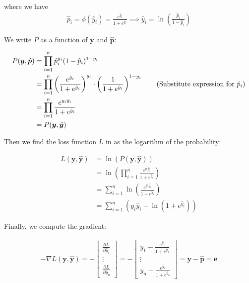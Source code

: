 \documentclass[12pt]{article}
\begin{document}
\begin{enumerate}
where we have
\begin{align*}
	\hat{p}_i = \phi(\hat{y}_i) = \frac{e^{\hat{y}_i}}{1 + e^{\hat{y}_i}}
	\implies 
	\hat{y}_i = \ln  \left(\frac{\hat{p}_i}{1 - \hat{p}_i}\right)
\end{align*}

We write $P$ as a function of $\bm{y}$ and $\hat{\bm{p}}$:

\begin{align*}
	P(\bm{y}, \hat{\bm{p}})
	&= \prod_{i=1}^{n}\hat{p}_i^{y_i}(1-\hat{p}_i)^{1-y_i}\\
	&= \prod_{i=1}^{n}
	\left(\frac{e^{\hat{y}_i}}{1 + e^{\hat{y}_i}}\right)^{y_i}\cdot
	\left(\frac{1}{1 + e^{\hat{y}_i}}\right)^{1 - y_i}
	\tag{Substitute expression for $\hat{p}_i$}\\
	&= \prod_{i=1}^{n} \frac{e^{y_i \hat{y}_i}}{1 + e^{\hat{y}_i}}\\
	&=P(\bm{y}, \hat{\bm{y}})
\end{align*}

Then we find the loss function $L$ in as the logarithm of the probability:

\begin{align*}
	L(\bm{y}, \hat{\bm{y}})
	&=\ln(P(\bm{y}, \hat{\bm{y}}))\\
	&=\ln \left(\prod_{i=1}^{n} \frac{e^{y_i \hat{y}_i}}{1 + e^{\hat{y}_i}}\right)\\
	&=\sum_{i=1}^{n}\ln\left(\frac{e^{y_i \hat{y}_i}}{1 + e^{\hat{y}_i}}\right)
	\tag{Product property of logarithms}\\
	&=\sum_{i=1}^{n}(y_i\hat{y}_i - \ln(1 + e^{\hat{y}_i}))
	\tag{Quotient property of logarithms}
\end{align*}

Finally, we compute the gradient:

\begin{align*}
	-\nabla L(\bm{y}, \hat{\bm{y}})
	= -\begin{bmatrix}
		\frac{\partial L}{\partial \hat{y}_1}\\
		\vdots\\
		\frac{\partial L}{\partial \hat{y}_n}
	\end{bmatrix}
	= -\begin{bmatrix}
		y_1 - \frac{e^{\hat{y}_1}}{1 + e^{\hat{y}_1}}\\
		\vdots\\
		y_n - \frac{e^{\hat{y}_n}}{1 + e^{\hat{y}_n}}
	\end{bmatrix}
	=\bm{y} - \hat{\bm{p}}
	=\bm{e}
\end{align*}


\end{enumerate}
\end{document}

